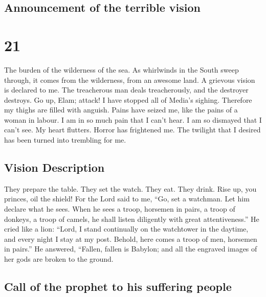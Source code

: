 \hypertarget{announcement-of-the-terrible-vision}{%
\subsection{Announcement of the terrible
vision}\label{announcement-of-the-terrible-vision}}

\hypertarget{section-20}{%
\section{21}\label{section-20}}

 The burden of the wilderness of the sea. As whirlwinds in
the South sweep through, it comes from the wilderness, from an awesome
land.  A grievous vision is declared to me. The
treacherous man deals treacherously, and the destroyer destroys. Go up,
Elam; attack! I have stopped all of Media's sighing. 
Therefore my thighs are filled with anguish. Pains have seized me, like
the pains of a woman in labour. I am in so much pain that I can't hear.
I am so dismayed that I can't see.  My heart flutters.
Horror has frightened me. The twilight that I desired has been turned
into trembling for me.

\hypertarget{vision-description}{%
\subsection{Vision Description}\label{vision-description}}

 They prepare the table. They set the watch. They eat.
They drink. Rise up, you princes, oil the shield!  For the
Lord said to me, ``Go, set a watchman. Let him declare what he sees.
 When he sees a troop, horsemen in pairs, a troop of
donkeys, a troop of camels, he shall listen diligently with great
attentiveness.''  He cried like a lion: ``Lord, I stand
continually on the watchtower in the daytime, and every night I stay at
my post.  Behold, here comes a troop of men, horsemen in
pairs.'' He answered, ``Fallen, fallen is Babylon; and all the engraved
images of her gods are broken to the ground.

\hypertarget{call-of-the-prophet-to-his-suffering-people}{%
\subsection{Call of the prophet to his suffering
people}\label{call-of-the-prophet-to-his-suffering-people}}

